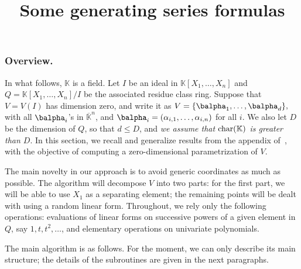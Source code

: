 \documentclass[12pt]{article}
\title{Some generating series formulas}
\date{}
\def\K {\ensuremath{\mathbb{K}}}
\def\Kbar {{\ensuremath{\overline{\mathbb{K}}}}}
\def\D {\ensuremath{D}}
\begin{document}
\maketitle

\subsubsection{Overview.}

In what follows, $\K$ is a field.  Let $I$ be an ideal in
$\K[X_1,\dots,X_n]$ and $Q=\K[X_1,\dots,X_n]/I$ be the associated
residue class ring. Suppose that $V=V(I)$ has dimension zero, and
write it as $V=\{\balpha_1,\dots,\balpha_d\},$ with all $\balpha_i$'s
in $\Kbar^n$, and $\balpha_i=(\alpha_{i,1},\dots,\alpha_{i,n})$ for
all $i$.  We also let $\D$ be the dimension of $Q$, so that $d \le
\D$, and {\em we assume that ${\rm char}(\K)$ is greater than $D$}. In
this section, we recall and generalize results from the appendix
of~\cite{BoSaSc03}, with the objective of computing a zero-dimensional
parametrization of $V$.

The main novelty in our approach is to avoid generic coordinates as
much as possible. The algorithm will decompose $V$ into two parts: for
the first part, we will be able to use $X_1$ as a separating element;
the remaining points will be dealt with using a random linear
form. Throughout, we rely only the following operations: evaluations
of linear forms on successive powers of a given element in $Q$, say
$1,t,t^2,\dots$, and elementary operations on univariate polynomials.

The main algorithm is as follows. For the moment, we can only describe
its main structure; the details of the subroutines are given in the
next paragraphs.
\end{document}
